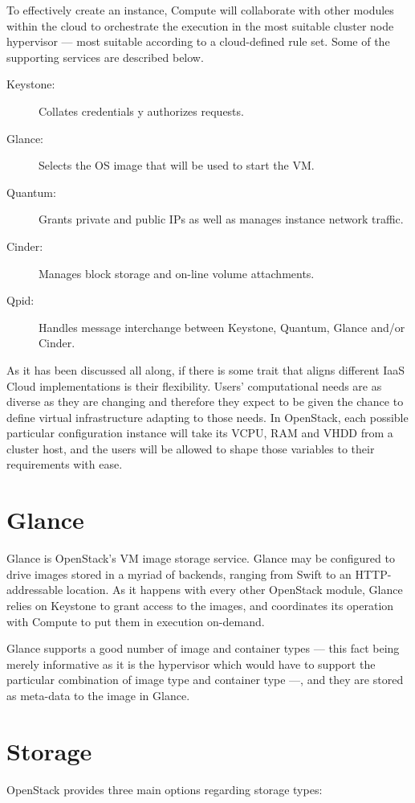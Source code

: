 To effectively create an instance, Compute will collaborate with other modules within the cloud to orchestrate the execution in the most suitable cluster node hypervisor --- most suitable according to a cloud-defined rule set. Some of the supporting services are described below.

\begin{description}
 \item[Keystone:] Collates credentials y authorizes requests.
 \item[Glance:] Selects the OS image that will be used to start the VM.
 \item[Quantum:] Grants private and public IPs as well as manages instance network traffic.
 \item[Cinder:] Manages block storage and on-line volume attachments.
 \item[Qpid:] Handles message interchange between Keystone, Quantum, Glance and/or Cinder.
\end{description}

As it has been discussed all along, if there is some trait that aligns different IaaS Cloud implementations is their flexibility. Users' computational needs are as diverse as they are changing and therefore they expect to be given the chance to define virtual infrastructure adapting to those needs. In OpenStack, each possible particular configuration instance will take its VCPU, RAM and VHDD from a cluster host, and the users will be allowed to shape those variables to their requirements with ease.

\section{Glance}\label{sec:glance}
\noindent Glance is OpenStack's VM image storage service. Glance may be configured to drive images stored in a myriad of backends, ranging from Swift to an HTTP-addressable location. As it happens with every other OpenStack module, Glance relies on Keystone to grant access to the images, and coordinates its operation with Compute to put them in execution on-demand.

Glance supports a good number of image and container types --- this fact being merely informative as it is the hypervisor which would have to support the particular combination of image type and container type ---, and they are stored as meta-data to the image in Glance.

\section{Storage}\label{sec:almacenamiento}
\noindent OpenStack provides three main options regarding storage types:

